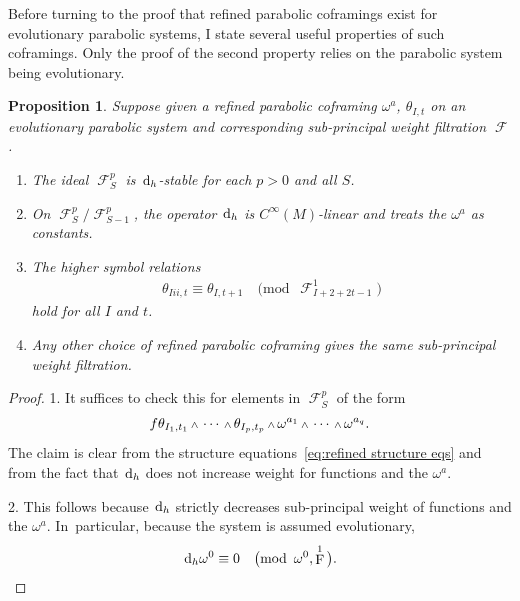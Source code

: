 \documentclass[pdftex]{sigma}
\renewcommand{\d}{{\rm d}}
\renewcommand{\mod}[1]{\quad\big(\mathrm{mod\enspace} #1\big)}
\newcommand{\w}{{\mathchoice{\,{\scriptstyle\wedge}\,}{{\scriptstyle\wedge}}
 {{\scriptscriptstyle\wedge}}{{\scriptscriptstyle\wedge}}}}
\newcommand{\thetas}[1]{\theta_{#1}}
\DeclareMathOperator{\pwf}{F}
\DeclareMathOperator{\swf}{\mathcal{F}}
\renewcommand{\dh}{\ensuremath{\hspace{1pt} \d_h}}
\newcommand{\cMinfty}{C^\infty(M)}
\numberwithin{equation}{section}
\newtheorem{Proposition}[Theorem]{Proposition}
{ \theoremstyle{definition}
\newtheorem{Definition}[Theorem]{Definition}
\newtheorem{Example}[Theorem]{Example}
\newtheorem{Remark}[Theorem]{Remark} }
\begin{document}
\begin{Example}
 Before turning to the proof that refined parabolic coframings exist for evolutionary parabolic systems, I state several useful properties of such coframings. Only the proof of the second property relies on the parabolic system being evolutionary.
 \begin{Proposition}
 Suppose given a refined parabolic coframing $\omega^a$, $\thetas{I,t}$ on an evolutionary parabolic system and corresponding sub-principal weight filtration $\swf$.
 \begin{enumerate}\itemsep=0pt
 \item[$1.$] The ideal $\swf^p_{S}$ is $\dh$-stable for each $p>0$ and all $S$.

 \item[$2.$] On $\swf^p_S / \swf^p_{S-1}$, the operator $\dh$ is $\cMinfty$-linear and treats the $\omega^a$ as constants.

 \item[$3.$] The higher symbol relations
 \begin{gather*}
 \thetas{Iii,t} \equiv \thetas{I,t+1} \mod{\swf^1_{I+2+2t-1}}
 \end{gather*}
 hold for all $I$ and $t$.

 \item[$4.$] Any other choice of refined parabolic coframing gives the same sub-principal weight filtration.
 \end{enumerate}
 \end{Proposition}
 \begin{proof}
 1. It suffices to check this for elements in $\swf^p_{S}$ of the form
 \begin{gather*}
 f \thetas{I_1,t_1}\w\cdots\w\thetas{I_p,t_p}\w\omega^{a_1}\w\cdots\w\omega^{a_{q}} .
 \end{gather*}
 The claim is clear from the structure equations~\eqref{eq:refined structure eqs} and from the fact that $\dh$ does not increase weight for functions and the $\omega^a$.

 2. This follows because $\dh$ strictly decreases sub-principal weight of functions and the $\omega^a$. In~particular, because the system is assumed evolutionary,
 \begin{gather*}
 \dh\omega^0 \equiv 0 \mod{\omega^0, \pwf^1} .
 \end{gather*}


\end{proof}
\end{Example}
\end{document}
